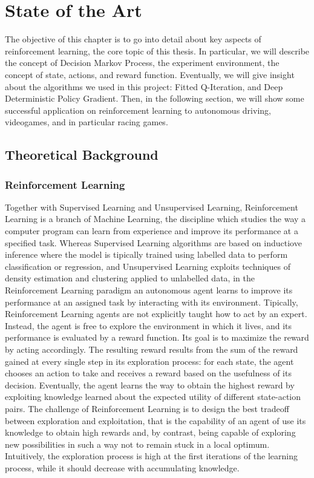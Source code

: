 \chapter{State of the Art}
\label{State of the Art}
\thispagestyle{empty}



The objective of this chapter is to go into detail about key aspects of reinforcement learning, the core topic of this thesis. In particular, we will describe the concept of Decision Markov Process, the experiment environment, the concept of state, actions, and reward function. Eventually, we will give insight about the algorithms we used in this project: Fitted Q-Iteration, and Deep Deterministic Policy Gradient. 
Then, in the following section, we will show some successful application on reinforcement learning to autonomous driving, videogames, and in particular racing games.


\section{Theoretical Background}

\subsection{Reinforcement Learning}
Together with Supervised Learning and Unsupervised Learning, Reinforcement Learning is a branch of Machine Learning, the discipline which studies the way a computer program can learn from experience and improve its performance at a specified task. Whereas Supervised Learning algorithms are based on inductiove inference where the model is tipically trained using labelled data to perform classification or regression, and Unsupervised Learning exploits techniques of density estimation and clustering applied to unlabelled data, in the Reinforcement Learning paradigm an autonomous agent learns to improve its performance at an assigned task by interacting with its environment.
Tipically, Reinforcement Learning agents are not explicitly taught how to act by an expert. Instead, the agent is free to explore the environment in which it lives, and its performance is evaluated by a reward function. Its goal is to maximize the reward by acting accordingly. The resulting reward results from the sum of the reward gained at every single step in its exploration process: for each state, the agent chooses an action to take and receives a reward based on the usefulness of its decision. Eventually, the agent learns the way to obtain the highest reward by exploiting knowledge learned about the expected utility of different state-action pairs. The challenge of Reinforcement Learning is to design the best tradeoff between exploration and exploitation, that is the capability of an agent of use its knowledge to obtain high rewards and, by contrast, being capable of exploring new possibilities in such a way not to remain stuck in a local optimum. Intuitively, the exploration process is high at the first iterations of the learning process, while it should decrease with accumulating knowledge.

